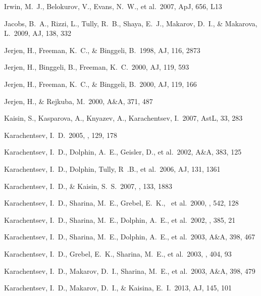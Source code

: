 \documentclass[12pt,onecolumn]{emulateapj}
\begin{document}
\begin{thebibliography}{}
Irwin, M.~J., Belokurov, V., Evans, N.~W., et al.\ 2007, ApJ, 656, L13 

Jacobs, B.~A., Rizzi, L., Tully, R.~B., Shaya, E.~J., Makarov, D.~I., \& Makarova, L.\ 2009, AJ, 138, 332
 
Jerjen, H., Freeman, K.~C., \& Binggeli, B.\ 1998, AJ, 116, 2873

Jerjen, H., Binggeli, B., Freeman, K.~C.\ 2000, AJ, 119, 593 

Jerjen, H., Freeman, K.~C., \& Binggeli, B.\ 2000, AJ, 119, 166 
 
Jerjen, H., \& Rejkuba, M.\ 2000, A\&A, 371, 487 

Kaisin, S., Kasparova, A., Knyazev, A., Karachentsev, I.\ 2007, AstL, 33, 283 

Karachentsev, I.~D.\ 2005, \aj, 129, 178

Karachentsev, I.~D., Dolphin, A.~E., Geisler, D., et al.\ 2002, A\&A, 383, 125

Karachentsev, I.~D., Dolphin, Tully, R~.B., et al.\ 2006, AJ, 131, 1361

Karachentsev, I.~D., \& Kaisin, S.~S.\ 2007, \aj, 133, 1883 

Karachentsev, I.~D., Sharina, M.~E., Grebel, E.~K., ~et al.\ 2000, \apj, 542, 128 

Karachentsev, I.~D., Sharina, M.~E., Dolphin, A.~E., et al.\ 2002, \aap, 385, 21

Karachentsev, I.~D., Sharina, M.~E., Dolphin, A.~E., et al.\ 2003, A\&A, 398, 467

Karachentsev, I.~D., Grebel, E.~K., Sharina, M.~E., et al.\ 2003, \aap, 404, 93

Karachentsev, I.~D., Makarov, D.~I., Sharina, M.~E., et al.\ 2003, A\&A, 398, 479

Karachentsev, I.~D., Makarov, D.~I., \& Kaisina, E.~I.\ 2013, AJ, 145, 101


\end{thebibliography}
\end{document}
